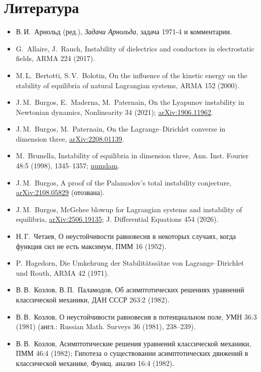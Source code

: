 \documentclass[11pt,a4paper]{article}
\theoremstyle{definition}
\begin{document}
\section*{Литература}
\small
\begin{itemize}[leftmargin=*,itemsep=1pt]
\item[{[Ar]}] В.\,И.~Арнольд (ред.), \emph{Задачи Арнольда}, задача 1971-4 и комментарии.
\item[{[AR17]}] G.~Allaire, J.~Rauch, Instability of dielectrics and conductors in electrostatic fields, ARMA 224 (2017).
\item[{[BB00]}] M.\,L.~Bertotti, S.\,V.~Bolotin, On the influence of the kinetic energy on the stability of equilibria of natural Lagrangian systems, ARMA 152 (2000).
\item[{[BMP21]}] J.\,M.~Burgos, E.~Maderna, M.~Paternain, On the Lyapunov instability in Newtonian dynamics, Nonlinearity 34 (2021); \href{https://arxiv.org/abs/1906.11962}{arXiv:1906.11962}.
\item[{[BP22]}] J.\,M.~Burgos, M.~Paternain, On the Lagrange--Dirichlet converse in dimension three, \href{https://arxiv.org/abs/2208.01139}{arXiv:2208.01139}.
\item[{[Br98]}] M.~Brunella, Instability of equilibria in dimension three, Ann. Inst. Fourier 48:5 (1998), 1345--1357; \href{http://www.numdam.org/item/AIF_1998__48_5_1345_0/}{numdam}.
\item[{[Bu21]}] J.\,M.~Burgos, A proof of the Palamodov's total instability conjecture, \href{https://arxiv.org/abs/2108.05829}{arXiv:2108.05829} (отозвана).
\item[{[Bu25]}] J.\,M.~Burgos, McGehee blowup for Lagrangian systems and instability of equilibria, \href{https://arxiv.org/abs/2506.19135}{arXiv:2506.19135}; J. Differential Equations 454 (2026).
\item[{[Ch52]}] Н.\,Г.~Четаев, О неустойчивости равновесия в некоторых случаях, когда функция сил не есть максимум, ПММ 16 (1952).
\item[{[Ha71]}] P.~Hagedorn, Die Umkehrung der Stabilitätssätze von Lagrange--Dirichlet und Routh, ARMA 42 (1971).
\item[{[KP82]}] В.\,В.~Козлов, В.\,П.~Паламодов, Об асимптотических решениях уравнений классической механики, ДАН СССР 263:2 (1982).
\item[{[Ko81]}] В.\,В.~Козлов, О неустойчивости равновесия в потенциальном поле, УМН 36:3 (1981) (англ.: Russian Math. Surveys 36 (1981), 238--239).
\item[{[Ko82]}] В.\,В.~Козлов, Асимптотические решения уравнений классической механики, ПММ 46:4 (1982); Гипотеза о существовании асимптотических движений в классической механике, Функц. анализ 16:4 (1982).

\end{itemize}
\end{document}
